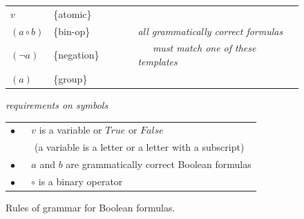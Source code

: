 \begin{figure}
\begin{center}
\begin{spacing}{0.9}
\begin{tabular}{llll}
$v$             & \{atomic\}    &~~~~& \\
$(a \circ b)$   & \{bin-op\}    &~~~~& \emph{all grammatically correct formulas} \\
$(\neg a)$      & \{negation\}  &~~~~& \emph{~~~must match one of these templates}  \\
$(a)$           & \{group\}     &~~~~& \\
\end{tabular}

\vspace{2 mm}

\emph{requirements on symbols}

\begin{tabular}{l}
\hline
$\bullet$ ~~ $v$ is a variable or $True$ or $False$ \\
~~~~~(a variable is a letter or a letter with a subscript) \\
$\bullet$ ~~ $a$ and $b$ are grammatically correct Boolean formulas \\
$\bullet$ ~~ $\circ$ is a binary operator \\
\hline
\end{tabular}
\end{spacing}
\end{center}
\caption{Rules of grammar for Boolean formulas.}
\label{fig-02-grammar}
\end{figure}


